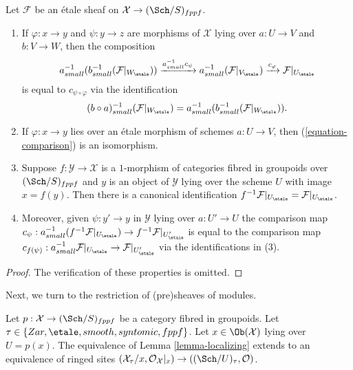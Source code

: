 \begin{lemma}
\label{lemma-comparison}
Let $\mathcal{F}$ be an \'etale sheaf on $\mathcal{X} \to (\Sch/S)_{fppf}$.
\begin{enumerate}
\item If $\varphi : x \to y$ and $\psi : y \to z$
are morphisms of $\mathcal{X}$ lying over $a : U \to V$ and
$b : V \to W$, then the composition
$$
a_{small}^{-1}(b_{small}^{-1} (\mathcal{F}|_{W_\etale}))
\xrightarrow{a_{small}^{-1}c_\psi}
a_{small}^{-1}(\mathcal{F}|_{V_\etale})
\xrightarrow{c_\varphi}
\mathcal{F}|_{U_\etale}
$$
is equal to $c_{\psi \circ \varphi}$ via the identification
$$
(b \circ a)_{small}^{-1}(\mathcal{F}|_{W_\etale}) =
a_{small}^{-1}(b_{small}^{-1} (\mathcal{F}|_{W_\etale})).
$$
\item If $\varphi : x \to y$ lies over an \'etale morphism of schemes
$a : U \to V$, then (\ref{equation-comparison}) is an isomorphism.
\item Suppose $f : \mathcal{Y} \to \mathcal{X}$ is a $1$-morphism of
categories fibred in groupoids over $(\Sch/S)_{fppf}$ and $y$ is
an object of $\mathcal{Y}$ lying over the scheme $U$ with image
$x = f(y)$. Then there is a canonical identification
$f^{-1}\mathcal{F}|_{U_\etale} = \mathcal{F}|_{U_\etale}$.
\item Moreover, given $\psi : y' \to y$ in $\mathcal{Y}$ lying over
$a : U' \to U$ the comparison map
$c_\psi : a_{small}^{-1}(f^{-1}\mathcal{F}|_{U_\etale}) \to
f^{-1}\mathcal{F}|_{U'_\etale}$ is equal to the
comparison map $c_{f(\psi)} : a_{small}^{-1}\mathcal{F}|_{U_\etale}
\to \mathcal{F}|_{U'_\etale}$ via the identifications in (3).
\end{enumerate}
\end{lemma}

\begin{proof}
The verification of these properties is omitted.
\end{proof}

\noindent
Next, we turn to the restriction of (pre)sheaves of modules.

\begin{lemma}
\label{lemma-localizing-structure-sheaf}
Let $p : \mathcal{X} \to (\Sch/S)_{fppf}$ be a category fibred
in groupoids. Let $\tau \in \{Zar, \etale, smooth, syntomic, fppf\}$.
Let $x \in \Ob(\mathcal{X})$ lying over $U = p(x)$.
The equivalence of
Lemma \ref{lemma-localizing}
extends to an equivalence of ringed sites
$(\mathcal{X}_\tau/x, \mathcal{O}_\mathcal{X}|_x) \to
((\Sch/U)_\tau, \mathcal{O})$.
\end{lemma}

